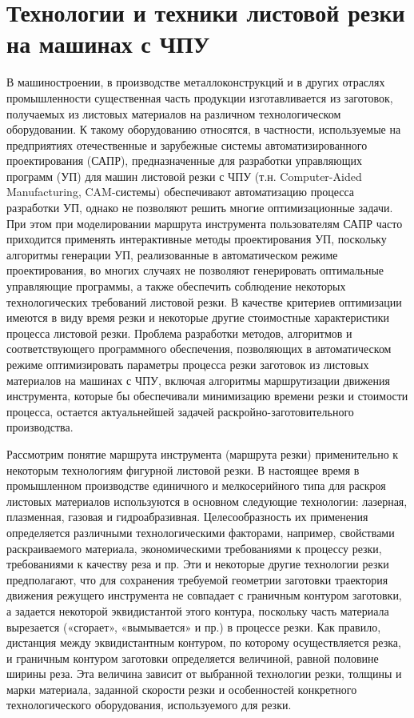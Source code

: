 \documentclass[12pt,twoside]{report}
\begin{document}
\section{Технологии и техники листовой резки на машинах с ЧПУ}

В машиностроении, в производстве металлоконструкций
и в других отраслях промышленности существенная часть продукции
изготавливается из заготовок,
получаемых из листовых материалов на различном технологическом оборудовании.
К такому оборудованию относятся, в частности,
используемые на предприятиях отечественные и зарубежные
системы автоматизированного проектирования (САПР),
предназначенные для разработки управляющих программ (УП)
для машин листовой резки с ЧПУ
(т.н. Computer-Aided Manufacturing, CAM-системы)
обеспечивают автоматизацию процесса разработки УП,
однако не позволяют решить многие оптимизационные задачи.
При этом при моделировании маршрута инструмента пользователям
САПР часто приходится применять интерактивные методы проектирования УП,
поскольку алгоритмы генерации УП,
реализованные в автоматическом режиме проектирования,
во многих случаях не позволяют генерировать оптимальные управляющие программы,
а также обеспечить соблюдение некоторых технологических требований листовой резки.
В качестве критериев оптимизации имеются в виду время резки и
некоторые другие стоимостные характеристики процесса листовой резки.
Проблема разработки методов, алгоритмов и соответствующего программного обеспечения,
позволяющих в автоматическом режиме оптимизировать параметры
процесса резки заготовок из листовых материалов на машинах с ЧПУ,
включая алгоритмы маршрутизации движения инструмента,
которые бы обеспечивали минимизацию времени резки и стоимости процесса,
остается актуальнейшей задачей раскройно-заготовительного производства.

Рассмотрим понятие маршрута инструмента (маршрута резки)
применительно к некоторым технологиям фигурной листовой резки.
В настоящее время в промышленном производстве
единичного и мелкосерийного типа для раскроя листовых материалов
используются в основном следующие технологии:
лазерная, плазменная, газовая и гидроабразивная.
Целесообразность их применения определяется различными технологическими факторами,
например, свойствами раскраиваемого материала,
экономическими требованиями к процессу резки,
требованиями к качеству реза и пр.
Эти и некоторые другие технологии резки предполагают,
что для сохранения требуемой геометрии заготовки
траектория движения режущего инструмента не совпадает
с граничным контуром заготовки,
а задается некоторой эквидистантой этого контура,
поскольку часть материала вырезается («сгорает», «вымывается» и пр.)
в процессе резки.
Как правило, дистанция между эквидистантным контуром,
по которому осуществляется резка, и граничным контуром заготовки определяется величиной,
равной половине ширины реза.
Эта величина зависит от выбранной технологии резки,
толщины и марки материала, заданной скорости резки
и особенностей конкретного технологического оборудования,
используемого для резки.
\end{document}
